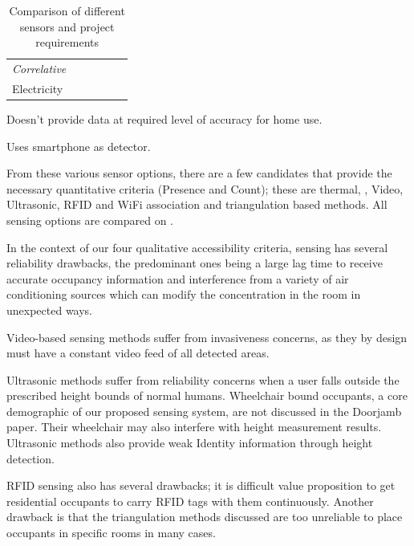 \documentclass[../thesis/thesis.tex]{subfiles}
\begin{document}
\begin{table}
\begin{threeparttable}
\begin{tabularx}{\textwidth}{|l|l|l||l||l|l|}
\hspace{3mm}\textit{Correlative} 	& & & & & \\
\hspace{8mm}Electricity 		& \cmark\ssup & \xmark & \cmark & & \\

\cline{1-6}
\end{tabularx}
\begin{tablenotes}
\item \ssup  Doesn't provide data at required level of accuracy for home use.
\item \tsup  Uses smartphone as detector.
\end{tablenotes}
\end{threeparttable}
\caption{Comparison of different sensors and project requirements}
\label{tab:litreview:taxonomycomp}
\end{table}

From these various sensor options, there are a few candidates that provide the necessary quantitative criteria (Presence and Count); these are thermal, \cdi, Video, Ultrasonic, RFID and WiFi association and triangulation based methods. All sensing options are compared on .

In the context of our four qualitative accessibility criteria, \cdi sensing has several reliability drawbacks, the predominant ones being a large lag time to receive accurate occupancy information and interference from a variety of air conditioning sources which can modify the \cdi concentration in the room in unexpected ways.

Video-based sensing methods suffer from invasiveness concerns, as they by design must have a constant video feed of all detected areas.

Ultrasonic methods suffer from reliability concerns when a user falls outside the prescribed height bounds of normal humans. Wheelchair bound occupants, a core demographic of our proposed sensing system, are not discussed in the Doorjamb paper. Their wheelchair may also interfere with height measurement results. Ultrasonic methods also provide weak Identity information through height detection.

RFID sensing also has several drawbacks; it is difficult value proposition to get residential occupants to carry RFID tags with them continuously. Another drawback is that the triangulation methods discussed are too unreliable to place occupants in specific rooms in many cases.
\end{document}
